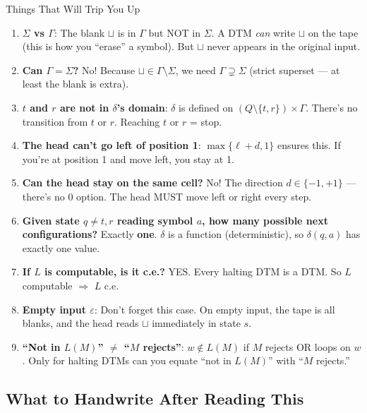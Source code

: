 \documentclass[11pt,a4paper]{article}
\begin{document}
\begin{conceptbox}{Things That Will Trip You Up}
\begin{enumerate}
\item \textbf{$\Sigma$ vs $\Gamma$}: The blank $\sqcup$ is in $\Gamma$ but NOT in $\Sigma$. A DTM \textit{can} write $\sqcup$ on the tape (this is how you ``erase'' a symbol). But $\sqcup$ never appears in the original input.

\item \textbf{Can $\Gamma = \Sigma$?} No! Because $\sqcup \in \Gamma \setminus \Sigma$, we need $\Gamma \supsetneq \Sigma$ (strict superset --- at least the blank is extra).

\item \textbf{$t$ and $r$ are not in $\delta$'s domain}: $\delta$ is defined on $(Q \setminus \{t,r\}) \times \Gamma$. There's no transition from $t$ or $r$. Reaching $t$ or $r$ = stop.

\item \textbf{The head can't go left of position 1}: $\max\{\ell + d, 1\}$ ensures this. If you're at position 1 and move left, you stay at 1.

\item \textbf{Can the head stay on the same cell?} No! The direction $d \in \{-1, +1\}$ --- there's no 0 option. The head MUST move left or right every step.

\item \textbf{Given state $q \neq t,r$ reading symbol $a$, how many possible next configurations?} Exactly \textbf{one}. $\delta$ is a function (deterministic), so $\delta(q,a)$ has exactly one value.

\item \textbf{If $L$ is computable, is it c.e.?} YES. Every halting DTM is a DTM. So $L$ computable $\Rightarrow$ $L$ c.e.

\item \textbf{Empty input $\varepsilon$}: Don't forget this case. On empty input, the tape is all blanks, and the head reads $\sqcup$ immediately in state $s$.

\item \textbf{``Not in $L(M)$'' $\neq$ ``$M$ rejects''}: $w \notin L(M)$ if $M$ rejects OR loops on $w$. Only for halting DTMs can you equate ``not in $L(M)$'' with ``$M$ rejects.''
\end{enumerate}
\end{conceptbox}

\subsection{What to Handwrite After Reading This}
\end{document}
